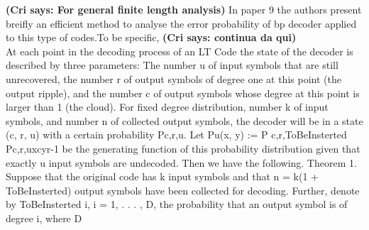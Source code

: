 \documentclass[12pt,a4paper,titlepage,twocolumn]{article}
\newcommand{\cri}[1]{\textcolor{MyColor2}{\textbf{(Cri says: #1)}}}
\begin{document}
\cri{For general finite length analysis}
In paper 9 the authors present breifly an efficient method to analyse the error probability of \gls{bp} decoder applied to this type of codes.To be specific, \cri{continua da qui}\\
At each point in the decoding process of an LT Code the state
of the decoder is described by three parameters: The number
u of input symbols that are still unrecovered, the number r of
output symbols of degree one at this point (the output ripple),
and the number c of output symbols whose degree at this point
is larger than 1 (the cloud). For fixed degree distribution,
number k of input symbols, and number n of collected output
symbols, the decoder will be in a state (c, r, u) with a certain
probability Pc,r,u. Let Pu(x, y) :=
P
c,r,ToBeInsterted Pc,r,uxcyr-1 be
the generating function of this probability distribution given
that exactly u input symbols are undecoded. Then we have
the following.
Theorem 1. Suppose that the original code has k input
symbols and that n = k(1 + ToBeInsterted) output symbols have been
collected for decoding. Further, denote by ToBeInsterted i, i = 1, . . . , D,
the probability that an output symbol is of degree i, where D
\end{document}
